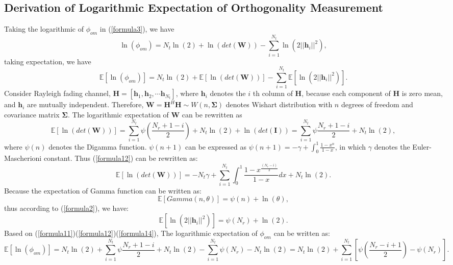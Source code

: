 \documentclass[12pt,letter,final]{article}
\begin{document}
\begin{spacing}{2.5}
\section{Derivation of Logarithmic Expectation of Orthogonality Measurement}
Taking the logarithmic of $\phi_{om}$ in (\ref{formula3}), we have 
\begin{equation}
\ln(\phi_{om})=N_{t}\ln(2)+\ln(det(\mathbf{W}))-\sum_{i=1}^{N_{t}}\ln(2||\mathbf{h}_{i}||^{2}),
\label{formula10}
\end{equation}
taking expectation, we have 
\begin{equation}
\mathbb{E}[\ln(\phi_{om})]=N_{t}\ln(2)+\mathbb{E}[\ln(det(\mathbf{W}))]-\sum_{i=1}^{N_{t}}\mathbb{E}[\ln(2||\mathbf{h}_{i}||^{2})].
\label{formula11}
\end{equation}
Consider Rayleigh fading channel, $\mathbf{H}=[\mathbf{h}_{1},\mathbf{h}_{2},\cdots \mathbf{h}_{N_{t}}]$, where $\mathbf{h}_{i}$ denotes the $i$ th column of $\mathbf{H}$, because each component of $\mathbf{H}$ is zero mean, and $\mathbf{h}_{i}$ are mutually independent. Therefore, $\mathbf{W}=\mathbf{H}^{H}\mathbf{H}\sim W(n, \mathbf{\Sigma})$ denotes Wishart distribution with $n$ degrees of freedom and covariance matrix $\mathbf{\Sigma}$. The logarithmic expectation of $\mathbf{W}$ can be rewritten as \cite{bishop2006pattern}
\begin{equation}
\mathbb{E}[\ln(det(\mathbf{W}))]=\sum_{i=1}^{N_{t}}\psi(\frac{N_{r}+1-i}{2})+N_{t}\ln(2)+\ln(det(\mathbf{I}))=\sum_{i=1}^{N_{t}}\psi{\frac{N_{r}+1-i}{2}}+N_{t}\ln(2),
\label{formula12}
\end{equation}
where $\psi(n)$ denotes the Digamma function. $\psi(n+1)$ can be expressed as $\psi(n+1)=-\gamma+\int_{0}^{1}\frac{1-x^{n}}{1-x}$, in which $\gamma$ denotes the Euler-Mascherioni constant. Thus (\ref{formula12}) can be rewritten as:
\begin{equation}
\mathbb{E}[\ln(det(\mathbf{W}))]=-N_{t}\gamma+\sum_{i=1}^{N_{t}}\int_{0}^{1}\frac{1-x^{\frac{(N_{r}-i)}{2}}}{1-x}dx+N_{t}\ln(2).
\label{formula13}
\end{equation} 
Because the expectation of Gamma function can be written as:
\begin{equation}
\mathbb{E}[Gamma(n,\theta)]=\psi(n)+\ln(\theta),
\end{equation}
thus according to (\ref{formula2}), we have:
\begin{equation}
\mathbb{E}[\ln(2||\mathbf{h}_{i}||^{2})]=\psi(N_{r})+\ln(2).
\label{formula14}
\end{equation}
Based on (\ref{formula11})(\ref{formula12})(\ref{formula14}), The logarithmic expectation of $\phi_{om}$ can be written as:
\begin{equation}
\mathbb{E}[\ln(\phi_{om})]=N_{t}\ln(2)+\sum_{i=1}^{N_{t}}\psi{\frac{N_{r}+1-i}{2}}+N_{t}\ln(2)-\sum_{i=1}^{N_{t}}\psi(N_{r})-N_{t}\ln(2)=N_{t}\ln(2)+\sum_{i=1}^{N_{t}}[\psi(\frac{N_{r}-i+1}{2})-\psi(N_{r})].
\label{formula15}
\end{equation}

\end{spacing}
\end{document}
